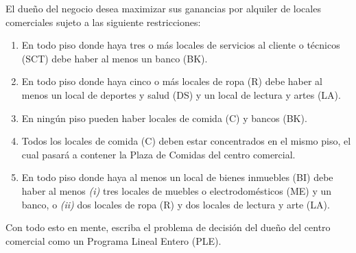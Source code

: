 \documentclass[ a4paper, twoside, 11pt]{article}
\begin{document}
\begin{problem}
\begin{itemize}
\begin{table}[htb]
\begin{tabular}{|l|c|}
\end{tabular}
\end{table}

\end{itemize}

El due\~no del negocio desea maximizar sus ganancias por alquiler de locales comerciales sujeto a las siguiente restricciones: 
\begin{enumerate}[label=\textbf{\alph*)}]
\item En todo piso donde haya tres o m\'as locales de servicios al cliente o t\'ecnicos (SCT) debe haber al menos un banco (BK). 
\item En todo piso donde haya cinco o m\'as locales de ropa (R) debe haber al menos un local de deportes y salud (DS) y un local de lectura y artes (LA). 
\item En ning\'un piso pueden haber locales de comida (C) y bancos (BK). 
\item Todos los locales de comida (C) deben estar concentrados en el mismo piso, el cual pasar\'a a contener la Plaza de Comidas del centro comercial. 
\item En todo piso donde haya al menos un local de bienes inmuebles (BI) debe haber al menos \textit{(i)} tres locales de muebles o electrodom\'esticos (ME) y un banco, o \textit{(ii)} dos locales de ropa (R) y dos locales de lectura y arte (LA). 
\end{enumerate}

Con todo esto en mente, escriba el problema de decisi\'on del due\~no del centro comercial como un Programa Lineal Entero (PLE). 

\QED

\end{problem}
\vspace{\baselineskip}
\end{document}
